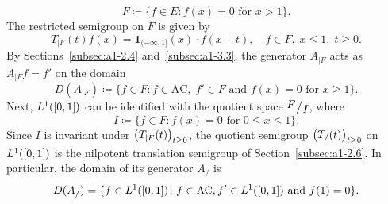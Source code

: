 \begin{example*}
\[    F \coloneq \{f \in E \colon f(x) = 0 \text{ for } x > 1\}.
\]
The restricted semigroup on $F$ is given by
\[
    T_{\vert F}(t)f(x) = \mathbf{1}_{(-\infty,1]}(x) \cdot f(x+t),
    \quad f \in F,\; x \leq 1,\; t \geq 0.
\]
By Sections~\ref{subsec:a1-2.4} and~\ref{subsec:a1-3.3}, the generator 
$A_{\vert F}$ acts as $A_{\vert F}f = f'$ on the domain
\[
    D(A_{\vert F}) \coloneq \{f \in F \colon f \in \mathrm{AC},\; 
    f' \in F \text{ and } f(x) = 0 \text{ for } x \geq 1\}.
\]
Next, $L^{1}(\left[ 0,1 \right])$ can be identified with the quotient space 
$\mfrac{F}{I}$, where
\[
    I \coloneq \{f \in F \colon f(x) = 0 \text{ for } 0 \leq x \leq 1\}.
\]
Since $I$ is invariant under $\mleft(T_{\vert F}(t)\mright)_{t \geq 0}$, 
the quotient semigroup $\mleft(T_{/}(t)\mright)_{t \geq 0}$ on 
$L^{1}(\left[ 0,1 \right])$ is the nilpotent translation semigroup of 
Section~\ref{subsec:a1-2.6}.
In particular, the domain of its generator $A_{/}$ is
\[
    D(A_{/}) = \{f \in L^{1}(\left[ 0,1 \right]) \colon f \in \mathrm{AC},  
    f' \in L^{1}(\left[ 0,1 \right]) \text{ and } f(1) = 0\}.
\]
\end{example*}
